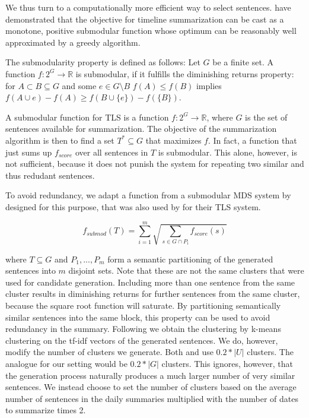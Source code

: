 \documentclass[a4paper,BCOR=10mm]{report}
\numberwithin{lemma}{chapter}
\numberwithin{definition}{chapter}
\begin{document}

We thus turn to a computationally more efficient way to select sentences.
\citet{markert} have demonstrated that the objective for timeline summarization can be cast as a monotone, positive submodular function whose optimum can be reasonably well approximated by a greedy algorithm.

The submodularity property is defined as follows:
 Let $G$ be a finite set. A function $f: 2^{G} \rightarrow \mathbb{R}$ is submodular, if it fulfills the diminishing returns property: for $A \subset B \subseteq G$ and some $e \in G \setminus B$ $f(A) \leq f(B)$ implies $f(A \cup e) - f(A) \geq f(B \cup \{e\}) - f(\{B\})$.

A submodular function for TLS is a function $f: 2^{G} \rightarrow \mathbb{R}$, where $G$ is the set of sentences available for summarization.
The objective of the summarization algorithm is then to find a set $T^{*} \subseteq G$ that maximizes $f$.
In fact, a function that just sums up $f_{\mathit{score}}$ over all sentences in $T$ is submodular. This alone, however, is not sufficient, because it does not punish the system for repeating two similar and thus redudant sentences.

To avoid redundancy, we adapt a function from a submodular MDS system by \citet{lin+blimes} designed for this purpose, that was also used by \citet{markert} for their TLS system.

\begin{equation}
f_{\mathit{submod}}(T) = \sum_{i = 1}^{m} \sqrt{\sum_{s \in G \cap P_i} f_{\mathit{score}}(s)}
\end{equation}

where $T \subseteq G$ and $P_1, ..., P_m$ form a semantic partitioning of the generated sentences into $m$ disjoint sets. Note that these are not the same clusters that were used for candidate generation. Including more than one sentence from the same cluster results in diminishing returns for further sentences from the same cluster, because the square root function will saturate.
By partitioning semantically similar sentences into the same block, this property can be used to avoid redundancy in the summary.
Following \citet{lin+blimes} we obtain the clustering by k-means clustering on the tf-idf vectors of the generated sentences. We do, however, modify the number of clusters we generate. Both \citet{lin+blimes} and \citet{markert} use $0.2 * |U|$ clusters. The analogue for our setting would be $0.2 * |G|$ clusters. This ignores, however, that the generation process naturally produces a much larger number of very similar sentences. We instead choose to set the number of clusters based on the average number of sentences in the daily summaries multiplied with the number of dates to summarize times 2.
\end{document}
